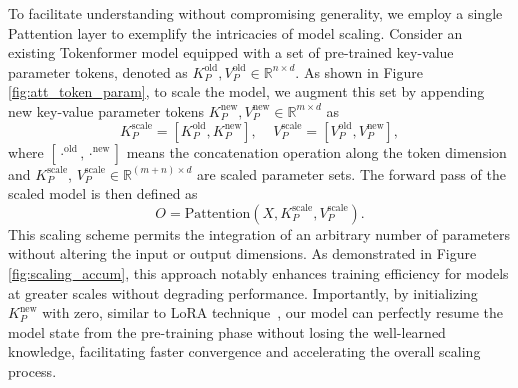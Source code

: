 \documentclass{article} %
\newcommand{\ourmethod}{Tokenformer\xspace}
\begin{document}
To facilitate understanding without compromising generality, we employ a single Pattention layer to exemplify the intricacies of model scaling. Consider an existing \ourmethod model equipped with a set of pre-trained key-value parameter tokens, denoted as $K_P^{\text{old}}, V_P^{\text{old}} \in \mathbb{R}^{n \times d}$. As shown in Figure \ref{fig:att_token_param}, to scale the model, we augment this set by appending new key-value parameter tokens $K_P^{\text{new}}, V_P^{\text{new}} \in \mathbb{R}^{m \times d}$ as
\begin{equation}
    K_P^{\text{scale}} = \left[K_P^{\text{old}}, K_P^{\text{new}}\right], ~~~~~V_P^{\text{scale}} = \left[V_P^{\text{old}}, V_P^{\text{new}}\right],
\end{equation}
where $[\cdot ^{\text{old}}, \cdot ^{\text{new}}]$ means the concatenation operation along the token dimension and $K_P^{\text{scale}}$, $V_P^{\text{scale}} \in \mathbb{R}^{(m+n) \times d}$ are scaled parameter sets. The forward pass of the scaled model is then defined as
\begin{equation}
    O = \text{Pattention}\left(X, K_P^{\text{scale}}, V_P^{\text{scale}}\right).
    \label{eq:token-parameter-3}
\end{equation}
This scaling scheme permits the integration of an arbitrary number of parameters without altering the input or output dimensions. As demonstrated in Figure \ref{fig:scaling_accum}, this approach notably enhances training efficiency for models at greater scales without degrading performance. Importantly, by initializing $K^{\text{new}}_P$ with zero, similar to LoRA technique~\citep{hu2022lora}, our model can perfectly resume the model state from the pre-training phase without losing the well-learned knowledge, facilitating faster convergence and accelerating the overall scaling process.
\end{document}

